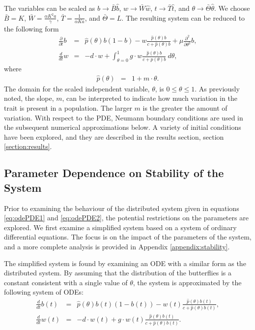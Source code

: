 \documentclass[12pt]{article}
\begin{document}
The variables can be scaled as $b\rightarrow \bar{B}\hat{b}$,
$w\rightarrow \bar{W}\hat{w}$, $t\rightarrow \bar{T}\hat{t}$, and
$\theta\rightarrow \bar{\Theta}\hat{\theta}$. We choose $\bar{B}=K$,
$\bar{W}=\frac{\alpha K^2 a}{\gamma}$, $\bar{T}=\frac{1}{\alpha K a}$,
and $\bar{\Theta}=L$. The resulting system can be reduced to the
following form
\begin{eqnarray}
  \label{eq:scaledodePDE1}
  \frac{\partial}{\partial t} b & = &
      \hat{p}(\theta) b (1 - b)
      -  w \frac{\hat{p}(\theta) b}{c+\hat{p}(\theta)b}
      + \mu \frac{\partial^2}{\partial \theta^2} b , \\
  \label{eq:scaledodePDE2}
  \frac{d}{dt} w & = & -d \cdot w +
      \int^1_{\theta=0} g \cdot w \frac{\hat{p}(\theta) b }{c + \hat{p}(\theta) b} ~ d\theta,
\end{eqnarray}
where
\begin{eqnarray}
  \hat{p}(\theta) & = & 1 + m \cdot \theta.
\end{eqnarray}
The domain for the scaled independent variable, $\theta$, is
$0\leq\theta\leq 1$. As previously noted, the slope, $m$, can be
interpreted to indicate how much variation in the trait is present in
a population. The larger $m$ is the greater the amount of variation.
With respect to the PDE, Neumann boundary conditions are used in the
subsequent numerical approximations below. A variety of initial
conditions have been explored, and they are described in the results
section, section \ref{section:results}.


\subsection{Parameter Dependence on Stability of the System}

Prior to examining the behaviour of the distributed system given in
equations \ref{eq:odePDE1} and \ref{eq:odePDE2}, the potential
restrictions on the parameters are explored. We first examine a
simplified system based on a system of ordinary differential
equations.  The focus is on the impact of the parameters of the
system, and a more complete analysis is provided in Appendix
\ref{appendix:stability}.

The simplified system is found by examining an ODE with a similar form
as the distributed system. By assuming that the distribution of the
butterflies is a constant consistent with a single value of $\theta$,
the system is approximated by the following system of ODEs:
\begin{eqnarray}
  \label{eq:scaledODE1}
  \frac{d}{dt} b(t) & = &
      \hat{p}(\theta) b(t) (1 - b(t))
      -  w(t) \frac{\hat{p}(\theta) b(t)}{c+\hat{p}(\theta)b(t)}, \\
  \label{eq:scaledODE2}
  \frac{d}{dt} w(t) & = & -d \cdot w(t) +
       g \cdot w(t) \frac{\hat{p}(\theta) b(t) }{c + \hat{p}(\theta) b(t)}.
\end{eqnarray}
\end{document}
